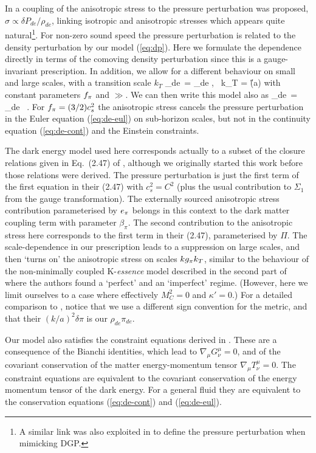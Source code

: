 In \cite{Song:2010rm} a coupling of the anisotropic stress to the pressure 
perturbation was proposed, $\sigma \propto \delta P_{de}/\rho_{de}$, linking 
isotropic and anisotropic stresses which appears quite natural\footnote{A similar 
link was also exploited in \cite{Kunz:2006ca} to define the pressure perturbation when mimicking DGP.}. For non-zero sound 
speed the pressure perturbation is related to the density perturbation by our 
model (\ref{eq:dp}). Here we formulate the dependence directly in terms of the 
comoving density perturbation since this is a gauge-invariant prescription. In 
addition, we allow for a different behaviour on small and large scales, with a 
transition scale $k_T$
\be
\pi_{de}\ = \ff {} \Delta_{de} \quad , \, k_T = \gg
\H(a)
\ee
with constant parameters $\ff$ and $\gg$. We can then write this model also as
\be
\pi_{de}\ =  \Delta_{de} \, .
\label{eq:model2}
\ee
For $\ff = (3/2) c_s^2$ the anisotropic stress cancels the pressure perturbation 
in the Euler equation (\ref{eq:de-eul}) on sub-horizon scales, but not in the 
continuity equation (\ref{eq:de-cont}) and the Einstein constraints.

The dark energy model used here corresponds actually to a subset of the closure 
relations given in Eq.\ (2.47) of  \cite{Sawicki:2012re}, although we originally 
started this work before those relations were derived. The pressure perturbation 
is just the first term of the first equation in their (2.47) with $c_s^2=C^2$ 
(plus the usual contribution to $\Sigma_1$ from the gauge transformation). The 
externally sourced anisotropic stress contribution parameterised by $\aa$ belongs 
in this context to the dark matter coupling term with parameter $\beta_\pi$. The 
second contribution to the anisotropic stress here corresponds to the first term 
in their (2.47), parameterised by $\Pi$. The scale-dependence in our prescription 
leads to a suppression on large scales, and then `turns on' the anisotropic 
stress on scales $k \mug k_T$, similar to the behaviour of the non-minimally 
coupled K-\emph{essence} model described in the second part of \cite{Sawicki:2012re} 
where the authors found a `perfect' and an `imperfect' regime. (However, 
here we limit ourselves to a case where effectively $M_C^2 = 0$ and $\kappa'=0$.) 
For a detailed comparison to \cite{Sawicki:2012re}, notice that we use a 
different sign convention for the metric, and that their $(k/a)^2 \delta\pi$ is 
our $\rho_{de} \pi_{de}$. 

Our model also satisfies the constraint equations derived in \cite{Baker:2012zs}. These are a consequence
of the Bianchi identities, which lead to $\nabla_\mu G^\mu_\nu=0$, and of the covariant 
conservation of the matter energy-momentum tensor $\nabla_\mu T^\mu_\nu=0$. The constraint
equations are equivalent to the covariant conservation of the energy momentum tensor of the
dark energy. For a general fluid they are equivalent to the conservation equations (\ref{eq:de-cont}) and (\ref{eq:de-eul}).

